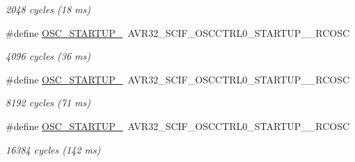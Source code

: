 \begin{DoxyCompactItemize}
\begin{DoxyCompactList}\small\item\em 2048 cycles (18 ms) \end{DoxyCompactList}\item 
\#define \hyperlink{group__osc__group_gaae54d19924d2ad66d9430cd80f09ae5f}{\-O\-S\-C\-\_\-\-S\-T\-A\-R\-T\-U\-P\-\_}~\-A\-V\-R32\-\_\-\-S\-C\-I\-F\-\_\-\-O\-S\-C\-C\-T\-R\-L0\-\_\-\-S\-T\-A\-R\-T\-U\-P\-\_\-\_\-\-R\-C\-O\-S\-C
\begin{DoxyCompactList}\small\item\em 4096 cycles (36 ms) \end{DoxyCompactList}\item 
\#define \hyperlink{group__osc__group_ga9c1185f69f68afd0eaa23ed90b6a810b}{\-O\-S\-C\-\_\-\-S\-T\-A\-R\-T\-U\-P\-\_}~\-A\-V\-R32\-\_\-\-S\-C\-I\-F\-\_\-\-O\-S\-C\-C\-T\-R\-L0\-\_\-\-S\-T\-A\-R\-T\-U\-P\-\_\-\_\-\-R\-C\-O\-S\-C
\begin{DoxyCompactList}\small\item\em 8192 cycles (71 ms) \end{DoxyCompactList}\item 
\#define \hyperlink{group__osc__group_ga38472e5c0ec660be10fe707646ba3b7d}{\-O\-S\-C\-\_\-\-S\-T\-A\-R\-T\-U\-P\-\_}~\-A\-V\-R32\-\_\-\-S\-C\-I\-F\-\_\-\-O\-S\-C\-C\-T\-R\-L0\-\_\-\-S\-T\-A\-R\-T\-U\-P\-\_\-\_\-\-R\-C\-O\-S\-C
\begin{DoxyCompactList}\small\item\em 16384 cycles (142 ms) \end{DoxyCompactList}\end{DoxyCompactItemize}
